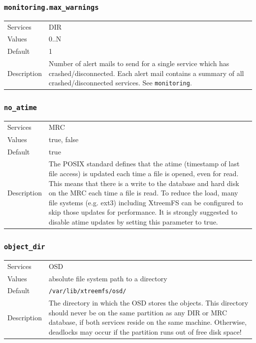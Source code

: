 \documentclass[a4paper,10pt]{book}
\begin{document}
\subsubsection{\texttt{monitoring.max\_warnings}}
\begin{tabular}{lp{10cm}}
 Services & DIR\\
 Values   & 0..N \\
 Default  & 1\\
 Description & Number of alert mails to send for a single service which has crashed/disconnected. Each alert mail contains a summary of all crashed/disconnected services. See \texttt{monitoring}.
\end{tabular}

\subsubsection{\texttt{no\_atime}}
\begin{tabular}{lp{10cm}}
 Services & MRC\\
 Values   & true, false \\
 Default  & true\\
 Description & The POSIX standard defines that the atime (timestamp of last file access) is updated each time a file is opened, even for read. This means that there is a write to the database and hard disk on the MRC each time a file is read. To reduce the load, many file systems (e.g. ext3) including XtreemFS can be configured to skip those updates for performance. It is strongly suggested to disable atime updates by setting this parameter to true.
\end{tabular}

\subsubsection{\texttt{object\_dir}}
\begin{tabular}{lp{10cm}}
 Services & OSD\\
 Values   & absolute file system path to a directory\\
 Default  & \texttt{/var/lib/xtreemfs/osd/}\\
 Description & The directory in which the OSD stores the objects. This directory should never be on the same partition as any DIR or MRC database, if both services reside on the same machine. Otherwise, deadlocks may occur if the partition runs out of free disk space!
\end{tabular}
\end{document}
